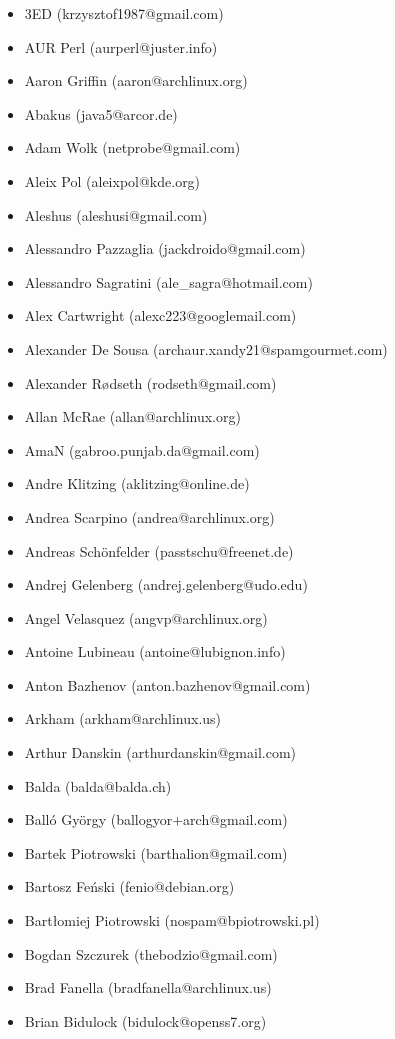 \begin{itemize}
\item  3ED (krzysztof1987@gmail.com)
\item  AUR Perl (aurperl@juster.info)
\item  Aaron Griffin (aaron@archlinux.org)
\item  Abakus (java5@arcor.de)
\item  Adam Wolk (netprobe@gmail.com)
\item  Aleix Pol (aleixpol@kde.org)
\item  Aleshus (aleshusi@gmail.com)
\item  Alessandro Pazzaglia (jackdroido@gmail.com)
\item  Alessandro Sagratini (ale\_sagra@hotmail.com)
\item  Alex Cartwright (alexc223@googlemail.com)
\item  Alexander De Sousa (archaur.xandy21@spamgourmet.com)
\item  Alexander Rødseth (rodseth@gmail.com)
\item  Allan McRae (allan@archlinux.org)
\item  AmaN (gabroo.punjab.da@gmail.com)
\item  Andre Klitzing (aklitzing@online.de)
\item  Andrea Scarpino (andrea@archlinux.org)
\item  Andreas Schönfelder (passtschu@freenet.de)
\item  Andrej Gelenberg (andrej.gelenberg@udo.edu)
\item  Angel Velasquez (angvp@archlinux.org)
\item  Antoine Lubineau (antoine@lubignon.info)
\item  Anton Bazhenov (anton.bazhenov@gmail.com)
\item  Arkham (arkham@archlinux.us)
\item  Arthur Danskin (arthurdanskin@gmail.com)
\item  Balda (balda@balda.ch)
\item  Balló György (ballogyor+arch@gmail.com)
\item  Bartek Piotrowski (barthalion@gmail.com)
\item  Bartosz Feński (fenio@debian.org)
\item  Bartłomiej Piotrowski (nospam@bpiotrowski.pl)
\item  Bogdan Szczurek (thebodzio@gmail.com)
\item  Brad Fanella (bradfanella@archlinux.us)
\item  Brian Bidulock (bidulock@openss7.org)

\end{itemize}
